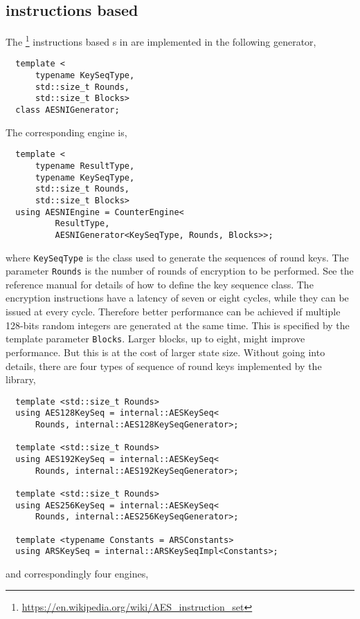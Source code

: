\subsection{\protect\aesni instructions based \protect\rng}
\label{sub:AES-NI instructions based RNG}

The \aesni\footnote{\url{https://en.wikipedia.org/wiki/AES_instruction_set}}
instructions based \rng{}s in \textcite{Salmon:2011um} are implemented in the
following generator,
\begin{Verbatim}
  template <
      typename KeySeqType,
      std::size_t Rounds,
      std::size_t Blocks>
  class AESNIGenerator;
\end{Verbatim}
The corresponding \rng engine is,
\begin{Verbatim}
  template <
      typename ResultType,
      typename KeySeqType,
      std::size_t Rounds,
      std::size_t Blocks>
  using AESNIEngine = CounterEngine<
          ResultType,
          AESNIGenerator<KeySeqType, Rounds, Blocks>>;
\end{Verbatim}
where \verb|KeySeqType| is the class used to generate the sequences of round
keys. The parameter \verb|Rounds| is the number of rounds of \aes encryption to
be performed. See the reference manual for details of how to define the key
sequence class. The \aesni encryption instructions have a latency of seven or
eight cycles, while they can be issued at every cycle. Therefore better
performance can be achieved if multiple 128-bits random integers are generated
at the same time. This is specified by the template parameter \verb|Blocks|.
Larger blocks, up to eight, might improve performance. But this is at the cost
of larger state size. Without going into details, there are four types of
sequence of round keys implemented by the library,
\begin{Verbatim}
  template <std::size_t Rounds>
  using AES128KeySeq = internal::AESKeySeq<
      Rounds, internal::AES128KeySeqGenerator>;

  template <std::size_t Rounds>
  using AES192KeySeq = internal::AESKeySeq<
      Rounds, internal::AES192KeySeqGenerator>;

  template <std::size_t Rounds>
  using AES256KeySeq = internal::AESKeySeq<
      Rounds, internal::AES256KeySeqGenerator>;

  template <typename Constants = ARSConstants>
  using ARSKeySeq = internal::ARSKeySeqImpl<Constants>;
\end{Verbatim}
and correspondingly four \rng engines,

